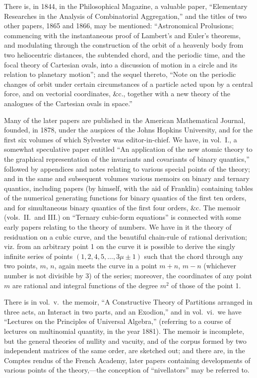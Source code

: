 \documentclass[11pt,a4paper]{article}
\theoremstyle{plain}
\begin{document}
There is, in 1844, in the Philosophical Magazine, a valuable paper, ``Elementary Researches in the Analysis of Combinatorial Aggregation,'' and the titles of two other papers, 1865 and 1866, may be mentioned: ``Astronomical Prolusions; commencing with the instantaneous proof of Lambert's and Euler's theorems, and modulating through the construction of the orbit of a heavenly body from two heliocentric distances, the subtended chord, and the periodic time, and the focal theory of Cartesian ovals, into a discussion of motion in a circle and its relation to planetary motion''; and the sequel thereto, ``Note on the periodic changes of orbit under certain circumstances of a particle acted upon by a central force, and on vectorial coordinates, \&c., together with a new theory of the analogues of the Cartesian ovals in space.''

Many of the later papers are published in the American Mathematical Journal, founded, in 1878, under the auspices of the Johns Hopkins University, and for the first six volumes of which Sylvester was editor-in-chief. We have, in vol.\ I., a somewhat speculative paper entitled ``An application of the new atomic theory to the graphical representation of the invariants and covariants of binary quantics,'' followed by appendices and notes relating to various special points of the theory; and in the same and subsequent volumes various memoirs on binary and ternary quantics, including papers (by himself, with the aid of Franklin) containing tables of the numerical generating functions for binary quantics of the first ten orders, and for simultaneous binary quantics of the first four orders, \&c. The memoir (vols.\ II.\ and III.) on ``Ternary cubic-form equations'' is connected with some early papers relating to the theory of numbers. We have in it the theory of residuation on a cubic curve, and the beautiful chain-rule of rational derivation; viz. from an arbitrary point 1 on the curve it is possible to derive the singly infinite series of points $(1, 2, 4, 5, \ldots, 3\mu \pm 1)$ such that the chord through any two points, $m$, $n$, again meets the curve in a point $m + n$, $m - n$ (whichever number is not divisible by 3) of the series; moreover, the coordinates of any point $m$ are rational and integral functions of the degree $m^2$ of those of the point 1.

There is in vol.\ v.\ the memoir, ``A Constructive Theory of Partitions arranged in three acts, an Interact in two parts, and an Exodion,'' and in vol.\ vi.\ we have ``Lectures on the Principles of Universal Algebra,'' (referring to a course of lectures on multinomial quantity, in the year 1881). The memoir is incomplete, but the general theories of nullity and vacuity, and of the corpus formed by two independent matrices of the same order, are sketched out; and there are, in the Comptes rendus of the French Academy, later papers containing developments of various points of the theory,---the conception of ``nivellators'' may be referred to.
\end{document}
